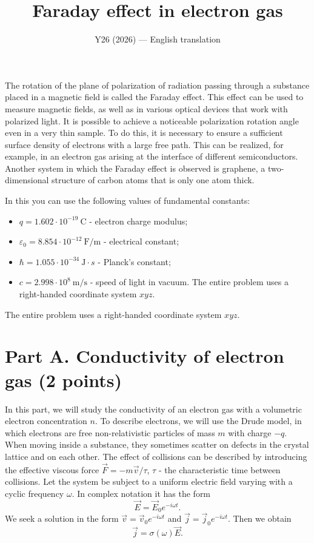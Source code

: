 \documentclass[11pt,a4paper]{article}
\title{\textbf{Faraday effect in electron gas}}
\author{\normalsize Y26 (2026) --- English translation}
\date{}
\begin{document}
\maketitle

The rotation of the plane of polarization of radiation passing through a substance placed in a magnetic field is called the Faraday effect. This effect can be used to measure magnetic fields, as well as in various optical devices that work with polarized light. It is possible to achieve a noticeable polarization rotation angle even in a very thin sample. To do this, it is necessary to ensure a sufficient surface density of electrons with a large free path. This can be realized, for example, in an electron gas arising at the interface of different semiconductors. Another system in which the Faraday effect is observed is graphene, a two-dimensional structure of carbon atoms that is only one atom thick.

In this you can use the following values of fundamental constants:
\begin{itemize}
    \item $q = 1.602 \cdot 10^{-19}~\text{C}$ - electron charge modulus;
    \item $\varepsilon_0 = 8.854 \cdot 10^{-12} ~\text{F}/\text{m}$ - electrical constant;
    \item $\hbar =1.055 \cdot 10^{-34} ~\text{J} \cdot {s}$ - Planck’s constant;
    \item $c =2.998 \cdot 10^{8} ~\text{m}/\text{s} $ - speed of light in vacuum. The entire problem uses a right-handed coordinate system $xyz$.
\end{itemize}

The entire problem uses a right-handed coordinate system $xyz$.

\section*{Part A. Conductivity of electron gas (2 points)}

In this part, we will study the conductivity of an electron gas with a volumetric electron concentration $n$. To describe electrons, we will use the Drude model, in which electrons are free non-relativistic particles of mass $m$ with charge $-q$. When moving inside a substance, they sometimes scatter on defects in the crystal lattice and on each other. The effect of collisions can be described by introducing the effective viscous force $\vec{F} = - m \vec{v}/\tau$, $\tau$ - the characteristic time between collisions. Let the system be subject to a uniform electric field varying with a cyclic frequency $\omega$. In complex notation it has the form $$ \vec{E} = \vec{E}_0 e^{-i\omega t}. $$We seek a solution in the form $\vec{v} = \vec{v}_0 e^{-i \omega t}$ and $\vec{j} = \vec{j}_0 e^{-i \omega t}$. Then we obtain $$ \vec{j} = \sigma(\omega) \vec{E}. $$
\end{document}
